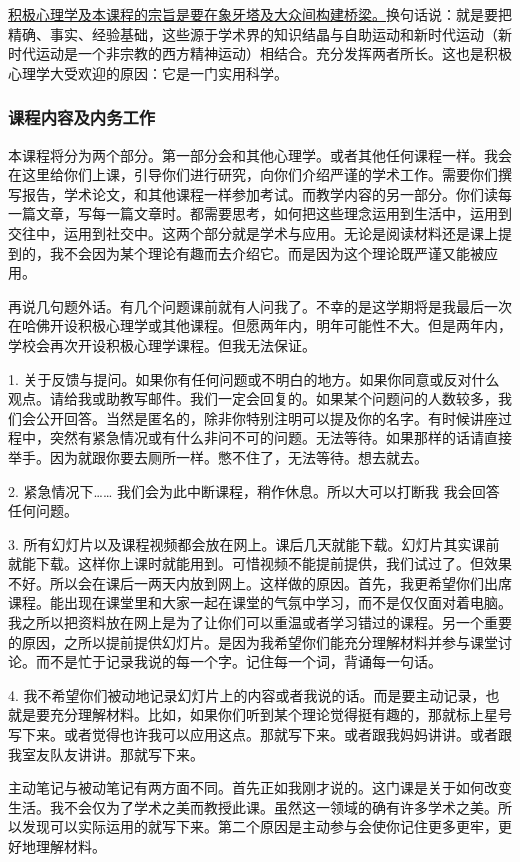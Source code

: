 \uline{积极心理学及本课程的宗旨是要在象牙塔及大众间构建桥梁。}换句话说：就是要把精确、事实、经验基础，这些源于学术界的知识结晶与自助运动和新时代运动（新时代运动是一个非宗教的西方精神运动）相结合。充分发挥两者所长。这也是积极心理学大受欢迎的原因：它是一门实用科学。

\subsubsection{课程内容及内务工作}
本课程将分为两个部分。第一部分会和其他心理学。或者其他任何课程一样。我会在这里给你们上课，引导你们进行研究，向你们介绍严谨的学术工作。需要你们撰写报告，学术论文，和其他课程一样参加考试。而教学内容的另一部分。你们读每一篇文章，写每一篇文章时。都需要思考，如何把这些理念运用到生活中，运用到交往中，运用到社交中。这两个部分就是学术与应用。无论是阅读材料还是课上提到的，我不会因为某个理论有趣而去介绍它。而是因为这个理论既严谨又能被应用。

再说几句题外话。有几个问题课前就有人问我了。不幸的是这学期将是我最后一次在哈佛开设积极心理学或其他课程。但愿两年内，明年可能性不大。但是两年内，学校会再次开设积极心理学课程。但我无法保证。

1. 关于反馈与提问。如果你有任何问题或不明白的地方。如果你同意或反对什么观点。请给我或助教写邮件。我们一定会回复的。如果某个问题问的人数较多，我们会公开回答。当然是匿名的，除非你特别注明可以提及你的名字。有时候讲座过程中，突然有紧急情况或有什么非问不可的问题。无法等待。如果那样的话请直接举手。因为就跟你要去厕所一样。憋不住了，无法等待。想去就去。

2. 紧急情况下…… 我们会为此中断课程，稍作休息。所以大可以打断我 我会回答任何问题。

3. 所有幻灯片以及课程视频都会放在网上。课后几天就能下载。幻灯片其实课前就能下载。这样你上课时就能用到。可惜视频不能提前提供，我们试过了。但效果不好。所以会在课后一两天内放到网上。这样做的原因。首先，我更希望你们出席课程。能出现在课堂里和大家一起在课堂的气氛中学习，而不是仅仅面对着电脑。我之所以把资料放在网上是为了让你们可以重温或者学习错过的课程。另一个重要的原因，之所以提前提供幻灯片。是因为我希望你们能充分理解材料并参与课堂讨论。而不是忙于记录我说的每一个字。记住每一个词，背诵每一句话。

4. 我不希望你们被动地记录幻灯片上的内容或者我说的话。而是要主动记录，也就是要充分理解材料。比如，如果你们听到某个理论觉得挺有趣的，那就标上星号写下来。或者觉得也许我可以应用这点。那就写下来。或者跟我妈妈讲讲。或者跟我室友队友讲讲。那就写下来。

主动笔记与被动笔记有两方面不同。首先正如我刚才说的。这门课是关于如何改变生活。我不会仅为了学术之美而教授此课。虽然这一领域的确有许多学术之美。所以发现可以实际运用的就写下来。第二个原因是主动参与会使你记住更多更牢，更好地理解材料。

